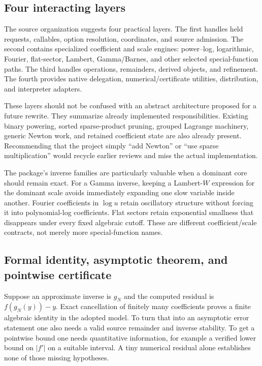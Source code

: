 \documentclass[11pt,letterpaper]{article}
\newcommand{\code}[1]{\texttt{\detokenize{#1}}}
\begin{document}
\subsection{Four interacting layers}
The source organization suggests four practical layers. The first handles held requests, callables, option resolution, coordinates, and source admission. The second contains specialized coefficient and scale engines: power--log, logarithmic, Fourier, flat-sector, Lambert, Gamma/Barnes, and other selected special-function paths. The third handles \code{GeneralizedSeries} operations, remainders, derived objects, and refinement. The fourth provides native delegation, numerical/certificate utilities, distribution, and interpreter adapters.\cite{kernel,native,mathicsdocs}

These layers should not be confused with an abstract architecture proposed for a future rewrite. They summarize already implemented responsibilities. Existing binary powering, sorted sparse-product pruning, grouped Lagrange machinery, generic Newton work, and retained coefficient state are also already present. Recommending that the project simply ``add Newton'' or ``use sparse multiplication'' would recycle earlier reviews and miss the actual implementation.\cite{register}

The package's inverse families are particularly valuable when a dominant core should remain exact. For a Gamma inverse, keeping a Lambert-$W$ expression for the dominant scale avoids immediately expanding one slow variable inside another. Fourier coefficients in $\log u$ retain oscillatory structure without forcing it into polynomial-log coefficients. Flat sectors retain exponential smallness that disappears under every fixed algebraic cutoff. These are different coefficient/scale contracts, not merely more special-function names.\cite{gamma,lambert,fourier}

\subsection{Formal identity, asymptotic theorem, and pointwise certificate}
Suppose an approximate inverse is $g_N$ and the computed residual is $f(g_N(y))-y$. Exact cancellation of finitely many coefficients proves a finite algebraic identity in the adopted model. To turn that into an asymptotic error statement one also needs a valid source remainder and inverse stability. To get a pointwise bound one needs quantitative information, for example a verified lower bound on $|f'|$ on a suitable interval. A tiny numerical residual alone establishes none of those missing hypotheses.
\end{document}
